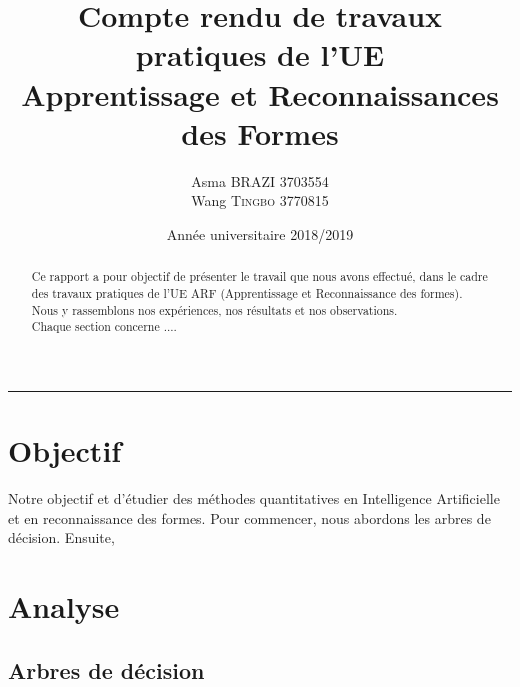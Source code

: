 \documentclass{article}
\title{Compte rendu de travaux pratiques de l'UE \\Apprentissage et Reconnaissances des Formes} %
\author{Asma \textsc{BRAZI} 3703554 \\ Wang \textsc{Tingbo} 3770815} %
\date{Année universitaire 2018/2019}
\begin{document}
\maketitle
\begin{center}
\rule{0.7\textwidth}{.4pt}
\end{center}
\begin{abstract}
Ce rapport a pour objectif de présenter le travail que nous avons effectué, dans le cadre des travaux pratiques de l'UE ARF (Apprentissage et Reconnaissance des formes). Nous y rassemblons nos expériences, nos résultats et nos observations.\\
Chaque section concerne ....
\end{abstract}


\section{Objectif}
\quad Notre objectif et d'étudier des méthodes quantitatives en Intelligence Artificielle et en reconnaissance des formes. Pour commencer, nous abordons les arbres de décision. Ensuite, 

\section{Analyse}

\subsection{Arbres de décision}
\end{document}
